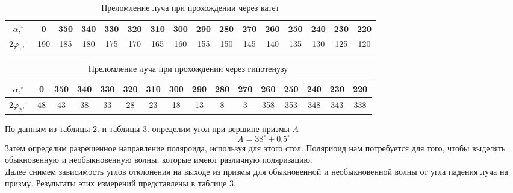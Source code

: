 \documentclass[a4paper,12pt]{article}
\begin{document}
\begin{table}[H]
\centering
\caption{Преломление луча при прохождении через катет}
\begin{tabular}{|c|c|c|c|c|c|c|c|c|c|c|c|c|c|c|c|}  \hline
$\alpha, ^\circ$ & 0 & 350 & 340 & 330 & 320 & 310 & 300 & 290 & 280 & 270 & 260 & 250 & 240 & 230 & 220 \\ \hline
$2\varphi_1, ^\circ$ & 190 & 185 & 180 & 175 & 170 & 165 & 160 & 155 & 150 & 145 & 140 & 135 & 130 & 125 & 120 \\ \hline
\end{tabular}
\end{table}

\begin{table}[H]
\centering
\caption{Преломление луча при прохождении через гипотенузу}
\begin{tabular}{|c|c|c|c|c|c|c|c|c|c|c|c|c|c|c|c|}  \hline
$\alpha, ^\circ$ & 0 & 350 & 340 & 330 & 320 & 310 & 300 & 290 & 280 & 270 & 260 & 250 & 240 & 230 & 220 \\ \hline
$2\varphi_2, ^\circ$ & 48 & 43 & 38 & 33 & 28 & 23 & 18 & 13 & 8 & 3 & 358 & 353 & 348 & 343 & 338 \\ \hline
\end{tabular}
\end{table}

\noindent По данным из таблицы 2. и таблицы 3. определим угол при вершине призмы $A$
$$
A = 38^\circ\pm0.5^\circ
$$
Затем определим разрешенное направление поляроида, используя для этого стол. Поляриоид нам потребуется для того, чтобы выделять обыкновенную и необыкновенную волны, которые имеют различную поляризацию. \\
Далее снимем зависимость углов отклонения на выходе из призмы для обыкновенной и необыкновенной волны от угла падения луча на призму. Результаты этих измерений представлены в таблице 3.
\end{document}
